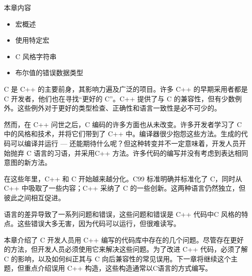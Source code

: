 本章内容

\begin{itemize}
\item
宏概述

\item
使用特定宏

\item
C 风格字符串

\item
布尔值的错误数据类型
\end{itemize}

C 是 C++ 的主要前身，其影响力遍及广泛的项目。许多 C++ 的早期采用者都是 C 开发者，他们也在寻找“更好的 C”。C++ 提供了与 C 的兼容性，但有少数例外。这些例外对于更好的类型检查、正确性和语言一致性是必不可少的。

然而，在 C++ 问世之后，C 编码的许多方面也从未改变。许多开发者学习了 C 中的风格和技术，并将它们带到了 C++ 中。编译器很少抱怨这些方法。生成的代码可以编译并运行 — 还能期待什么呢？但这种转变并不一定意味着，开发人员开始抛弃 C 语言的习语，并采用C++ 方法。许多代码的编写并没有考虑到表达相同意图的新方法。

在这些年里，C++ 和 C 开始越来越分化。C99 标准明确并标准化了 C，同时从 C++ 中吸取了一些内容；C++ 采纳了 C 的一些创新。这两种语言仍然独立，但彼此之间相互促进。

语言的差异导致了一系列问题和错误，这些问题和错误是 C++ 代码中C 风格的特点。这些错误大多无害，因为代码可以运行，但很难读写。

本章介绍了 C 开发人员用 C++ 编写的代码库中存在的几个问题。尽管存在更好的方法，但开发人员必须使用它来解决这些问题。为了改进 C++ 代码，必须了解 C 的影响，以及如何纠正其与 C 向后兼容性的常见误用。下一章将继续这个主题，但重点介绍误用 C++ 构造，这些构造通常以C语言的方式编写。







